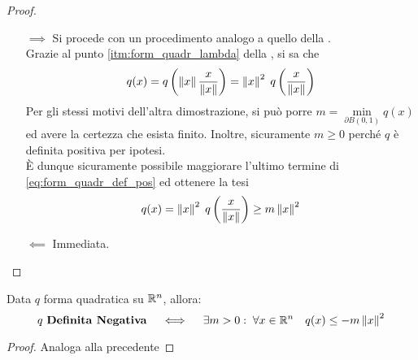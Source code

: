 \begin{appendices}
\begin{proposition}
	\begin{proof}~
		\begin{itemize}
			\item[$\implies$] Si procede con un procedimento analogo a quello della .\\
				Grazie al punto \ref{itm:form_quadr_lambda} della , si sa che
				\begin{equation}
					\label{eq:form_quadr_def_pos}
					q(x) = q \left( \left\|x\right\| \frac{x}{\left\|x\right\|} \right) = \left\|x\right\|^2 \; q \left( \frac{x}{\left\|x\right\|} \right)
				\end{equation}
				Per gli stessi motivi dell'altra dimostrazione, si può porre $m = \min\limits_{\partial B(0,1)} q(x)$
				ed avere la certezza che esista finito. Inoltre, sicuramente $m \geq 0$ perché $q$ è definita positiva per ipotesi.\\
				È dunque sicuramente possibile maggiorare l'ultimo termine di \cref{eq:form_quadr_def_pos} ed ottenere la tesi
				\[q(x) = \left\|x\right\|^2 \; q \left( \frac{x}{\left\|x\right\|} \right) \geq m \left\|x\right\|^2\]
			\item[$\impliedby$] Immediata.
		\end{itemize}
	\end{proof}
\end{proposition}
\begin{corollary}
	\label{coro:form_quadr_def_neg_q_leq_-m}
	Data $q$ forma quadratica su $\mathbb{R}^n$, allora:
	\[
		q \text{ \textbf{Definita Negativa}} \quad \iff \quad \exists m > 0:\; \forall x \in \mathbb{R}^n \quad q(x) \leq -m \left\|x\right\|^2
	\]
	\begin{proof}
		Analoga alla precedente
	\end{proof}
\end{corollary}


\end{appendices}
